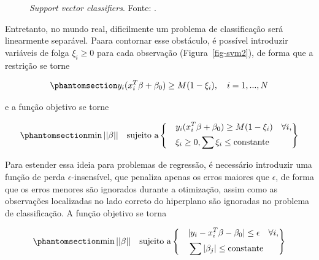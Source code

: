 \begin{apendicesenv}
\begin{figure}
\begin{minipage}{\linewidth}
{}


\end{minipage}%

\caption{\label{fig-svm}\emph{Support vector classifiers}. Fonte:
\textcite{hastie_elements_2009}.}

\end{figure}%

Entretanto, no mundo real, dificilmente um problema de classificação
será linearmente separável. Paara contornar esse obstáculo, é possível
introduzir variáveis de folga \(\xi_i \geq 0\) para cada observação
(Figura~\ref{fig-svm2}), de forma que a restrição se torne

\begin{equation}\phantomsection\label{eq-svm2}{
y_i(x_i^T\beta + \beta_0) \geq M(1 - \xi_i), \quad i = 1, ..., N
}\end{equation}

\noindent e a função objetivo se torne

\begin{equation}\phantomsection\label{eq-svm3}{
\min{||\beta||} \quad \text{sujeito a}
\left\{
  \begin{aligned}
    &\quad y_i(x_i^T\beta + \beta_0) \geq M(1 - \xi_i) \quad \forall i, \\
    &\quad \xi_i \geq 0, \sum{\xi_i} \leq \text{constante}
  \end{aligned}
\right\}
}\end{equation}

Para estender essa ideia para problemas de regressão, é necessário
introduzir uma função de perda \(\epsilon\)-insensível, que penaliza
apenas os erros maiores que \(\epsilon\), de forma que os erros menores
são ignorados durante a otimização, assim como as observações
localizadas no lado correto do hiperplano são ignoradas no problema de
classificação. A função objetivo se torna

\begin{equation}\phantomsection\label{eq-svm4}{
\min{||\beta||} \quad \text{sujeito a}
\left\{
  \begin{aligned}
    &\quad |y_i - x_i^T\beta - \beta_0| \leq \epsilon \quad \forall i, \\
    &\quad \sum{|\beta_j|} \leq \text{constante}
  \end{aligned}
\right\}
}\end{equation}


\end{apendicesenv}
